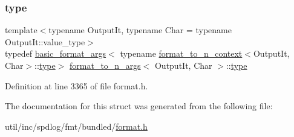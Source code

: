 \subsubsection{\texorpdfstring{type}{type}}
{\footnotesize\ttfamily template$<$typename Output\+It, typename Char = typename Output\+It\+::value\+\_\+type$>$ \\
typedef \hyperlink{classbasic__format__args}{basic\+\_\+format\+\_\+args}$<$ typename \hyperlink{structformat__to__n__context}{format\+\_\+to\+\_\+n\+\_\+context}$<$Output\+It, Char$>$\+::\hyperlink{structformat__to__n__args_a7ea8ff78b6e2db5594222df46970b069}{type}$>$ \hyperlink{structformat__to__n__args}{format\+\_\+to\+\_\+n\+\_\+args}$<$ Output\+It, Char $>$\+::\hyperlink{structformat__to__n__args_a7ea8ff78b6e2db5594222df46970b069}{type}}



Definition at line 3365 of file format.\+h.



The documentation for this struct was generated from the following file\+:\begin{DoxyCompactItemize}
\item 
util/inc/spdlog/fmt/bundled/\hyperlink{format_8h}{format.\+h}\end{DoxyCompactItemize}
